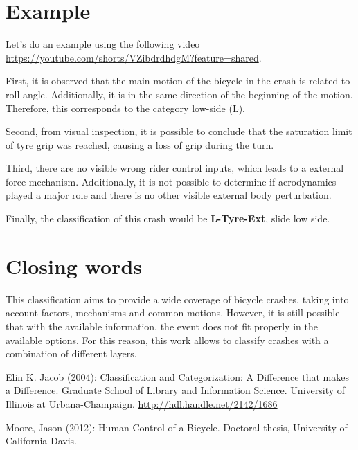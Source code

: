 \documentclass{article}
\begin{document}
\section{Example}

Let's do an example using the following video \url{https://youtube.com/shorts/VZibdrdhdgM?feature=shared}.

First, it is observed that the main motion of the bicycle in the crash is related to roll angle.
%
Additionally, it is in the same direction of the beginning of the motion.
%
Therefore, this corresponds to the category low-side (L).


Second, from visual inspection, it is possible to conclude that the saturation limit of tyre grip was reached, causing a loss of grip during the turn.


Third, there are no visible wrong rider control inputs, which leads to a external force mechanism.
%
Additionally, it is not possible to determine if aerodynamics played a major role and there is no other visible external body perturbation.


Finally, the classification of this crash would be \textbf{L-Tyre-Ext},  slide low side.


\section{Closing words}

This classification aims to provide a wide coverage of bicycle crashes, taking into account factors, mechanisms and common motions.
%
However, it is still possible that with the available information, the event does not fit properly in the available options.
%
For this reason, this work allows to classify crashes with a combination of different layers.



\begin{thebibliography}{9}

     Elin K. Jacob (2004):  Classification and Categorization: A Difference that makes a Difference. Graduate School of Library and Information Science. University of Illinois at Urbana-Champaign. \url{http://hdl.handle.net/2142/1686}

     Moore, Jason (2012): Human Control of a Bicycle. Doctoral thesis, University of California Davis.


\end{thebibliography}
\end{document}
